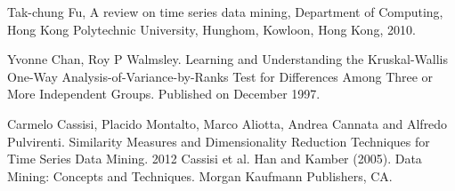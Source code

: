 \begin{thebibliography}{9}
Tak-chung Fu, A review on time series data mining, Department of Computing, Hong Kong Polytechnic University, Hunghom, Kowloon, Hong Kong, 2010.

Yvonne Chan, Roy P Walmsley. Learning and Understanding the Kruskal-Wallis One-Way Analysis-of-Variance-by-Ranks Test for Differences Among Three or More Independent Groups. Published on December 1997.

Carmelo Cassisi, Placido Montalto, Marco Aliotta, Andrea Cannata and Alfredo Pulvirenti. Similarity Measures
and Dimensionality Reduction Techniques for Time Series Data Mining. 2012 Cassisi et al.
Han and Kamber (2005). Data Mining: Concepts and Techniques. Morgan Kaufmann
Publishers, CA.
\end{thebibliography}